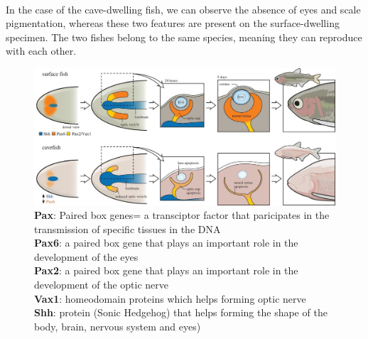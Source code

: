 \documentclass[draft, final]{report}
\begin{document}
\paragraph{}
In the case of the cave-dwelling fish, we can observe the absence of eyes and scale pigmentation, whereas these two features are present on the surface-dwelling specimen. The two fishes belong to
the same species, meaning they can reproduce with each other.
\begin{figure}[!ht]
  \centering
  \includegraphics[scale=0.35]{LateX/Images/Regression.png}
  \caption{\textbf{Pax}: Paired box genes= a transciptor factor that paricipates in the transmission of specific tissues in the DNA
          \\ \textbf{Pax6}:  a paired box gene that plays an important role in the development of the eyes
          \\ \textbf{Pax2}: a paired box gene that plays an important role in the development of the optic nerve
          \\ \textbf{Vax1}: homeodomain proteins which helps forming optic nerve
          \\ \textbf{Shh}: protein (Sonic Hedgehog) that helps forming the shape of the body, brain, nervous system and eyes)\cite{astyanaxregression}}
\end{figure}
\end{document}
